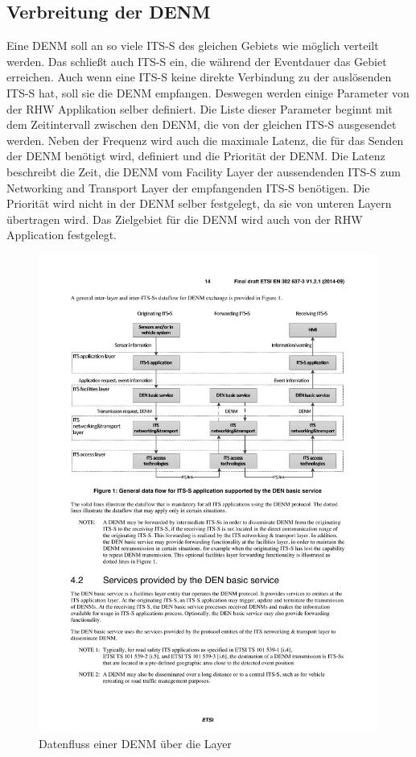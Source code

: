 \subsection{Verbreitung der DENM}
Eine \ac{DENM} soll an so viele \ac{ITS-S} des gleichen Gebiets wie möglich verteilt werden. Das schließt auch \ac{ITS-S} ein, die während der Eventdauer das Gebiet erreichen. Auch wenn eine \ac{ITS-S} keine direkte Verbindung zu der auslösenden \ac{ITS-S} hat, soll sie die \ac{DENM} empfangen. Deswegen werden einige Parameter von der \ac{RHW} Applikation selber definiert. Die Liste dieser Parameter beginnt mit dem Zeitintervall zwischen den \ac{DENM}, die von der gleichen \ac{ITS-S} ausgesendet werden. Neben der Frequenz wird auch die maximale Latenz, die für das Senden der \ac{DENM} benötigt wird, definiert und die Priorität der \ac{DENM}. Die Latenz beschreibt die Zeit, die \ac{DENM} vom Facility Layer der aussendenden \ac{ITS-S} zum Networking and Transport Layer der empfangenden \ac{ITS-S} benötigen. Die Priorität wird nicht in der \ac{DENM} selber festgelegt, da sie von unteren Layern übertragen wird. Das Zielgebiet für die \ac{DENM} wird auch von der \ac{RHW} Application festgelegt.


\begin{figure}[htbp]
	\includegraphics[width=0.99\textwidth]{content/images/04_facilitylayer/denVersendenLayerUeberblick.pdf}
	\caption{Datenfluss einer DENM über die Layer \cite{en302637-3}}
	\label{fig:darstellungDenVerteilenLayer}
\end{figure}

